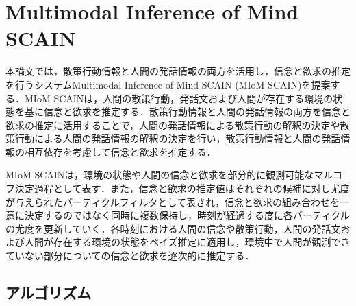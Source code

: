 \chapter{Multimodal Inference of Mind SCAIN}
\par
本論文では，散策行動情報と人間の発話情報の両方を活用し，信念と欲求の推定を行うシステムMultimodal Inference of Mind SCAIN (MIoM SCAIN)を提案する．MIoM SCAINは，人間の散策行動，発話文および人間が存在する環境の状態を基に信念と欲求を推定する．散策行動情報と人間の発話情報の両方を信念と欲求の推定に活用することで，人間の発話情報による散策行動の解釈の決定や散策行動による人間の発話情報の解釈の決定を行い，散策行動情報と人間の発話情報の相互依存を考慮して信念と欲求を推定する．

\par
MIoM SCAINは，環境の状態や人間の信念と欲求を部分的に観測可能なマルコフ決定過程として表す．また，信念と欲求の推定値はそれぞれの候補に対し尤度が与えられたパーティクルフィルタとして表され，信念と欲求の組み合わせを一意に決定するのではなく同時に複数保持し，時刻が経過する度に各パーティクルの尤度を更新していく．各時刻における人間の信念や散策行動，人間の発話文および人間が存在する環境の状態をベイズ推定に適用し，環境中で人間が観測できていない部分についての信念と欲求を逐次的に推定する．


\section{アルゴリズム}

